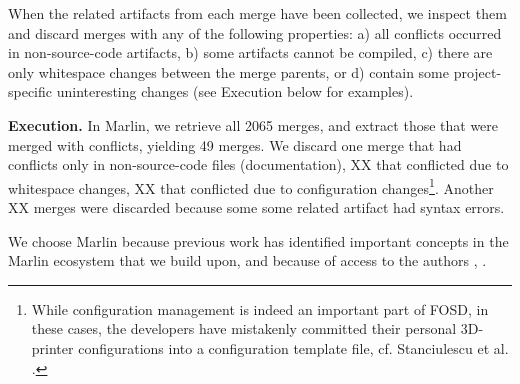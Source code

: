 When the related artifacts from each merge have been collected, we inspect them and discard merges with any of the following properties: 
a) all conflicts occurred in non-source-code artifacts, b) some artifacts cannot be compiled, c) there are only whitespace changes between the merge parents, or d) contain some project-specific uninteresting changes (see Execution below for examples).

\textbf{Execution.} In Marlin, we retrieve all 2065 merges, and extract those that were merged with conflicts, yielding 49 merges. We discard one merge that had conflicts only in non-source-code files (documentation), XX that conflicted due to whitespace changes, XX that conflicted due to configuration changes\footnote{While configuration management is indeed an important part of FOSD, in these cases, the developers have mistakenly committed their personal 3D-printer configurations into a configuration template file, cf. Stanciulescu et al. \cite{stanciulescu2015}.}. Another XX merges were discarded because some some related artifact had syntax errors.

We choose Marlin because previous work has identified important concepts in the Marlin ecosystem that we build upon, and because of access to the authors \cite{stanciulescu2015}, \cite{stanciulescu2016concepts}.

